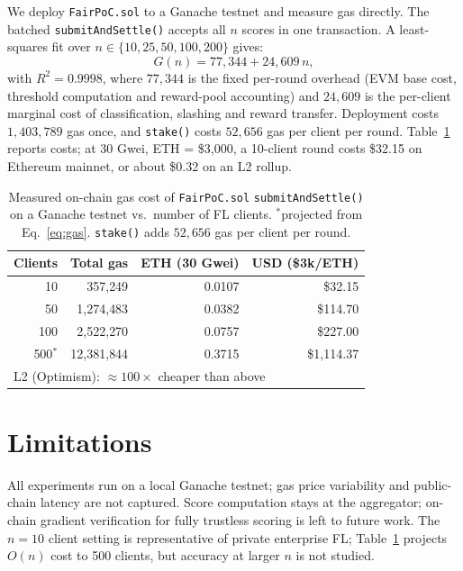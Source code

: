 \documentclass[conference]{IEEEtran}
\theoremstyle{remark}
\begin{document}
We deploy \texttt{FairPoC.sol} to a Ganache testnet and measure gas
directly. The batched \texttt{submitAndSettle()} accepts all $n$ scores in
one transaction. A least-squares fit over $n \in \{10, 25, 50, 100, 200\}$
gives:
\begin{equation}
G(n) = 77{,}344 + 24{,}609\,n ,
\label{eq:gas}
\end{equation}
with $R^2 = 0.9998$, where $77{,}344$ is the fixed per-round overhead
(EVM base cost, threshold computation and reward-pool accounting) and
$24{,}609$ is the per-client marginal cost of classification, slashing
and reward transfer. Deployment costs $1{,}403{,}789$ gas once, and
\texttt{stake()} costs $52{,}656$ gas per client per round.
Table~\ref{tab:gas} reports costs; at 30 Gwei, ETH = \$3{,}000,
a 10-client round costs \$32.15 on Ethereum mainnet, or about
\$0.32 on an L2 rollup.

\begin{table}[t]
\caption{Measured on-chain gas cost of \texttt{FairPoC.sol}
\texttt{submitAndSettle()} on a Ganache testnet vs.\ number of FL
clients. $^\ast$projected from Eq.~\ref{eq:gas}. \texttt{stake()} adds
$52{,}656$ gas per client per round.}
\label{tab:gas}
\centering
\renewcommand{\arraystretch}{1.1}
\begin{tabular}{rrrr}
\toprule
\textbf{Clients} & \textbf{Total gas} & \textbf{ETH (30 Gwei)} & \textbf{USD (\$3k/ETH)} \\
\midrule
10  & 357{,}249     & 0.0107  & \$32.15 \\
50  & 1{,}274{,}483  & 0.0382  & \$114.70 \\
100 & 2{,}522{,}270  & 0.0757  & \$227.00 \\
500$^\ast$ & 12{,}381{,}844 & 0.3715  & \$1{,}114.37 \\
\midrule
\multicolumn{4}{l}{\small L2 (Optimism): $\approx\!100\times$ cheaper than above} \\
\bottomrule
\end{tabular}
\end{table}

\section{Limitations}
\label{sec:limitations}

All experiments run on a local Ganache testnet; gas price variability
and public-chain latency are not captured. Score computation stays at
the aggregator; on-chain gradient verification for fully trustless
scoring is left to future work. The $n{=}10$ client setting is
representative of private enterprise FL; Table~\ref{tab:gas} projects
$O(n)$ cost to 500 clients, but accuracy at larger $n$ is not studied.
\end{document}
